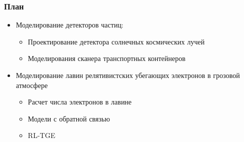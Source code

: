 \begin{frame}
    \setcounter{framenumber}{1}
    \maketitle
\end{frame}

\begin{frame}
\frametitle{План}
    \begin{itemize}
        \item Моделирование детекторов частиц:
        \begin{itemize}
        	\item Проектирование детектора солнечных космических лучей
        	\item Моделирования сканера транспортных контейнеров
        \end{itemize}
    	 \item Моделирование лавин релятивистских убегающих электронов в грозовой атмосфере
	    \begin{itemize}
	        \item Расчет числа электронов в лавине
		    \item Модели с обратной связью
		    \item RL-TGE
	    \end{itemize}

       

    \end{itemize}
\end{frame}

%
%
%
%
